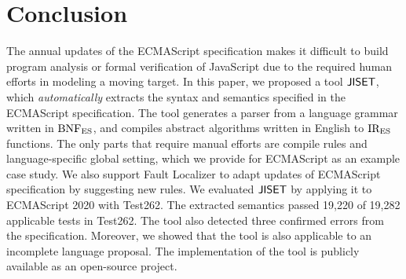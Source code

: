 \section{Conclusion}\label{sec:conclude}
The annual updates of the ECMAScript specification makes it difficult to
build program analysis or formal verification of JavaScript due to the
required human efforts in modeling a moving target.  In this paper,
we proposed a tool \( \text{\sf JISET} \), which \textit{automatically} extracts the
syntax and semantics specified in the ECMAScript specification.  The tool
generates a parser from a language grammar written in \( \text{BNF}_{\text{ES}} \), and
compiles abstract algorithms written in English to \( \text{IR}_\text{ES} \) functions.
The only parts that require manual efforts are compile rules and
language-specific global setting, which we provide for ECMAScript
as an example case study.  We also support \textsf{Fault Localizer} to
adapt updates of ECMAScript specification by suggesting new rules.
We evaluated \( \text{\sf JISET} \) by applying it to ECMAScript 2020 with Test262.
The extracted semantics passed 19,220 of 19,282 applicable tests in Test262.
The tool also detected three confirmed errors from the specification.
Moreover, we showed that the tool is also applicable to an incomplete
language proposal. The implementation of the tool is publicly available
as an open-source project.
